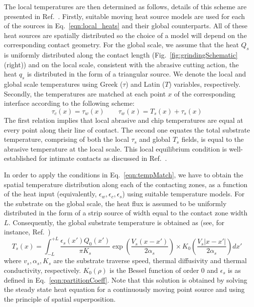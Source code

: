 \documentclass[11pt]{article}
\begin{document}
The local temperatures are then determined as follows, details of this scheme are presented in Ref.~\cite{DhamiJOM}. Firstly, suitable moving heat source models are used for each of the sources in Eq.~\ref{eqn:local_heats} and their global counterparts. All of these heat sources are spatially distributed so the choice of a model will depend on the corresponding contact geometry. For the global scale, we assume that the heat $Q_s$ is uniformly distributed along the contact length (Fig.~\ref{fig:grindingSchematic}(right)) and on the local scale, consistent with the abrasive cutting action, the heat $q_s$ is distributed in the form of a triangular source. We denote the local and global scale temperatures using Greek ($\tau$) and Latin ($T$) variables, respectively. Secondly, the temperatures are matched at each point $x$ of the corresponding interface according to the following scheme:
\begin{equation}
  \label{eqn:tempMatch}
  \tau_c(x) = \tau_w(x) \quad\quad \tau_w(x) = T_s(x) + \tau_s(x)
\end{equation}
The first relation implies that local abrasive and chip temperatures are equal at every point along their line of contact. The second one equates the total substrate temperature, comprising of both the local $\tau_s$ and global $T_s$ fields, is equal to the abrasive temperature at the local scale. This local equilibrium condition is well-established for intimate contacts as discussed in Ref.~\cite{DhamiJOM}.

In order to apply the conditions in Eq.~\ref{eqn:tempMatch}, we have to obtain the spatial temperature distribution along each of the contacting zones, as a function of the heat input (equivalently, $\epsilon_w, \epsilon_c, \epsilon_s$) using suitable temperature models. For the substrate on the global scale, the heat flux is assumed to be uniformly distributed in the form of a strip source of width equal to the contact zone width $L$. Consequently, the global substrate temperature is obtained as (see, for instance, Ref.~\cite{jaeger1942moving})
\begin{equation}
  \label{eqn:globalWPTemp}
  T_s(x)=\int_{-L}^{+L} \dfrac{\epsilon_s (x')Q_0(x')}{\pi K_s} \exp\left(\dfrac{V_s(x-x')}{2\alpha_s}\right)\times K_{0} \left(\dfrac{V_s|x-x'|}{2\alpha_s}\right)dx'
\end{equation}
where $v_s, \alpha_s, K_s$ are the substrate traverse speed, thermal diffusivity and thermal conductivity, respectively. $K_0(\rho)$ is the Bessel function of order 0 and $\epsilon_s$ is as defined in Eq.~\ref{eqn:partitionCoeff}. Note that this solution is obtained by solving the steady state heat equation for a continuously moving point source and using the principle of spatial superposition. 
\end{document}
